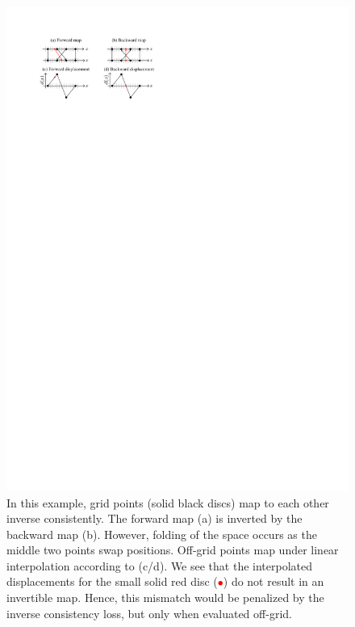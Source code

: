 \documentclass[10pt,twocolumn,letterpaper]{article} %
\begin{document}
\begin{figure}
  \centering
  \includegraphics[width=\columnwidth]{fwd_bwd_displacement.pdf}
  \caption{In this example, grid points (solid black discs) map to each other inverse consistently. The forward map (a) is inverted by the backward map (b). However, folding of the space occurs as the middle two points swap positions. Off-grid points map under linear interpolation according to (c/d). We see that the interpolated displacements for the small solid red disc (\textcolor{red}{$\bullet$}) do not result in an invertible map. Hence, this mismatch would be penalized by the inverse consistency loss, but only when evaluated off-grid.}
  \label{fig:off_grid_resampling}
  \vspace{-0.2cm}
\end{figure}
\end{document}
